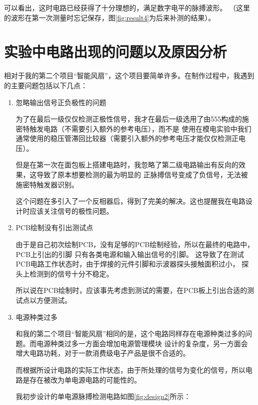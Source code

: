 \documentclass{article}
\begin{document}
\begin{spacing}{1.5}
    可以看出，这时电路已经获得了十分理想的，满足数字电平的脉搏波形。
    （这里的波形在第一次测量时忘记保存，图\ref{fig:result4}为后来补测的结果）。    

\section{实验中电路出现的问题以及原因分析}

    相对于我的第二个项目“智能风扇”，这个项目要简单许多。在制作过程中，我遇到的主要问题包括以下几点：

    \begin{enumerate}
        \item 忽略输出信号正负极性的问题
        
        为了在最后一级仅仅检测正极性信号，我才在最后一级选用了由555构成的施密特触发电路（不需要引入额外的参考电压），而不是
        使用在模电实验中我们通常使用的稳压管滞回比较器（需要引入额外的参考电压才能仅仅检测正电压）。 

        但是在第一次在面包板上搭建电路时，我忽略了第二级电路输出有反向的效果，这导致了原本想要检测的最为明显的
        正脉搏信号变成了负信号，无法被施密特触发器识别。

        这个问题在多引入了一个反相器后，得到了完美的解决。这也提醒我在电路设计时应该关注信号的极性问题。

        \item PCB绘制没有引出测试点
        
        由于是自己初次绘制PCB，没有足够的PCB绘制经验，所以在最终的电路中，PCB上引出的引脚
        只有各类电源和输入输出信号的引脚。
        这导致了在测试PCB电路工作状态时，由于焊接的元件引脚和示波器探头接触面积过小，
        探头上检测到的信号十分不稳定。
        
        所以说在PCB绘制时，应该事先考虑到测试的需要，在PCB板上引出合适的测试点以方便测试。

        \item 电源种类过多

        和我的第二个项目“智能风扇”相同的是，这个电路同样存在电源种类过多的问题。而电源种类过多一方面会增加电源管理模块
        设计的复杂度，另一方面会增大电路功耗，对于一款消费级电子产品是很不合适的。

        而根据所设计电路的实际工作状态，由于所处理的信号为变化的信号，所以电路是存在被改为单电源电路的可能性的。
        
        我初步设计的单电源脉搏检测电路如图\ref{fig:design2}所示：


\end{enumerate}
\end{spacing}
\end{document}
